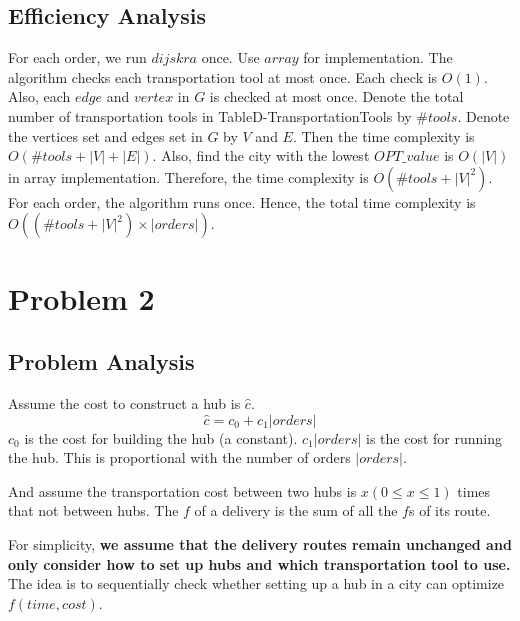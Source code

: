 \documentclass[11pt, a4paper]{article} %
\begin{document}
	\subsection{Efficiency Analysis}
	For each order, we run $dijskra$ once. Use $array$ for implementation. The algorithm checks each transportation tool at most once. Each check is $O(1)$. Also, each $edge$ and $vertex$ in $G$ is checked at most once. Denote the total number of transportation tools in TableD-TransportationTools by $\#tools$. Denote the vertices set and edges set in $G$ by $V$ and $E$. Then the time complexity is $O(\#tools+|V|+|E|)$. Also, find the city with the lowest $OPT\_value$ is $O(|V|)$ in array implementation. Therefore, the time complexity is $O(\#tools+|V|^2)$. For each order, the algorithm runs once. Hence, the total time complexity is $O((\#tools+|V|^2)\times |orders|)$.
\section{Problem 2}
	\subsection{Problem Analysis}\label{2-PA}
	Assume the cost to construct a hub is $\hat{c}$. 
	$$\hat{c}=c_0+c_1|orders|$$
	$c_0$ is the cost for building the hub (a constant). $c_1|orders|$ is the cost for running the hub. This is proportional with the number of orders $|orders|$.
	
	And assume the transportation cost between two hubs is $x(0\leq x\leq 1)$ times that not between hubs. The $f$ of a delivery is the sum of all the $f$s of its route.\par
	\indent For simplicity, \textbf{we assume that the delivery routes remain unchanged and only consider how to set up hubs and which transportation tool to use.} The idea is to sequentially check whether setting up a hub in a city can optimize $f(time,cost)$.
	
\end{document}
